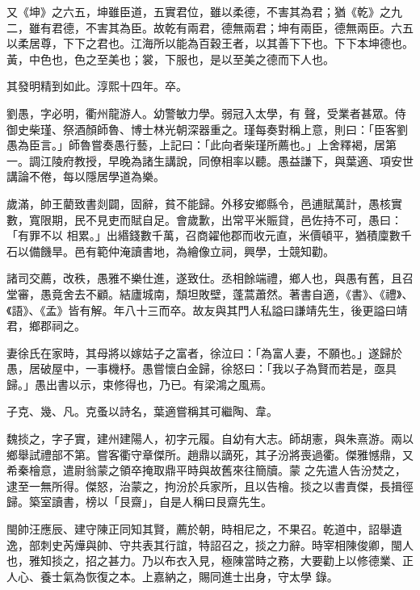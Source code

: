 \begin{pinyinscope}
 又《坤》之六五，坤雖臣道，五實君位，雖以柔德，不害其為君；猶《乾》之九二，雖有君德，不害其為臣。故乾有兩君，德無兩君；坤有兩臣，德無兩臣。六五以柔居尊，下下之君也。江海所以能為百穀王者，以其善下下也。下下本坤德也。黃，中色也，色之至美也；裳，下服也，是以至美之德而下人也。



 其發明精到如此。淳熙十四年。卒。



 劉愚，字必明，衢州龍游人。幼警敏力學。弱冠入太學，有
 聲，受業者甚眾。侍御史柴瑾、祭酒顏師魯、博士林光朝深器重之。瑾每奏對稱上意，則曰：「臣客劉愚為臣言。」師魯嘗奏愚行藝，上記曰：「此向者柴瑾所薦也。」上舍釋褐，居第一。調江陵府教授，早晚為諸生講說，同僚相率以聽。愚益謙下，與葉適、項安世講論不倦，每以隱居學道為樂。



 歲滿，帥王藺致書剡闢，固辭，貧不能歸。外移安鄉縣令，邑逋賦萬計，愚核實數，寬限期，民不見吏而賦自足。會歲歉，出常平米賑貸，邑佐持不可，愚曰：「有罪不以
 相累。」出緡錢數千萬，召商糴他郡而收元直，米價頓平，猶積廩數千石以備饑旱。邑有範仲淹讀書地，為繪像立祠，興學，士競知勸。



 諸司交薦，改秩，愚雅不樂仕進，遂致仕。丞相餘端禮，鄉人也，與愚有舊，且召堂審，愚竟舍去不顧。結廬城南，頹坦敗壁，蓬蒿蕭然。著書自適，《書》、《禮》、《語》、《孟》皆有解。年八十三而卒。故友與其門人私謚曰謙靖先生，後更謚曰靖君，鄉郡祠之。



 妻徐氏在家時，其母將以嫁姑子之富者，徐泣曰：「為富人妻，不願也。」遂歸於
 愚，居破屋中，一事機杼。愚嘗懷白金歸，徐怒曰：「我以子為賢而若是，亟具歸。」愚出書以示，束修得也，乃已。有梁鴻之風焉。



 子克、幾、凡。克蚤以詩名，葉適嘗稱其可繼陶、韋。



 魏掞之，字子實，建州建陽人，初字元履。自幼有大志。師胡憲，與朱熹游。兩以鄉舉試禮部不第。嘗客衢守章傑所。趙鼎以謫死，其子汾將喪過衢。傑雅憾鼎，又希秦檜意，遣尉翁蒙之領卒掩取鼎平時與故舊來往簡牘。蒙
 之先遣人告汾焚之，逮至一無所得。傑怒，治蒙之，拘汾於兵家所，且以告檜。掞之以書責傑，長揖徑歸。築室讀書，榜以「艮齋」，自是人稱曰艮齋先生。



 閩帥汪應辰、建守陳正同知其賢，薦於朝，時相尼之，不果召。乾道中，詔舉遺逸，部刺史芮燁與帥、守共表其行誼，特詔召之，掞之力辭。時宰相陳俊卿，閩人也，雅知掞之，招之甚力。乃以布衣入見，極陳當時之務，大要勸上以修德業、正人心、養士氣為恢復之本。上嘉納之，賜同進士出身，守太學
 錄。




\end{pinyinscope}

